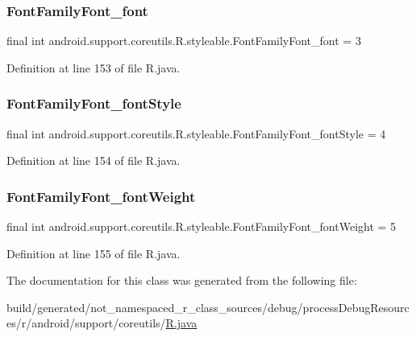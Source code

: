 \subsubsection{\texorpdfstring{FontFamilyFont\_font}{FontFamilyFont\_font}}
{\footnotesize\ttfamily final int android.\+support.\+coreutils.\+R.\+styleable.\+Font\+Family\+Font\+\_\+font = 3\hspace{0.3cm}{\ttfamily [static]}}



Definition at line 153 of file R.\+java.

\mbox{\label{classandroid_1_1support_1_1coreutils_1_1_r_1_1styleable_a1ee3d7ad4f282f1250a3ef4c1cb44053}} 
\subsubsection{\texorpdfstring{FontFamilyFont\_fontStyle}{FontFamilyFont\_fontStyle}}
{\footnotesize\ttfamily final int android.\+support.\+coreutils.\+R.\+styleable.\+Font\+Family\+Font\+\_\+font\+Style = 4\hspace{0.3cm}{\ttfamily [static]}}



Definition at line 154 of file R.\+java.

\mbox{\label{classandroid_1_1support_1_1coreutils_1_1_r_1_1styleable_a08ae17280f865bcf7bb8a223b10003cd}} 
\subsubsection{\texorpdfstring{FontFamilyFont\_fontWeight}{FontFamilyFont\_fontWeight}}
{\footnotesize\ttfamily final int android.\+support.\+coreutils.\+R.\+styleable.\+Font\+Family\+Font\+\_\+font\+Weight = 5\hspace{0.3cm}{\ttfamily [static]}}



Definition at line 155 of file R.\+java.



The documentation for this class was generated from the following file\+:\begin{DoxyCompactItemize}
\item 
build/generated/not\+\_\+namespaced\+\_\+r\+\_\+class\+\_\+sources/debug/process\+Debug\+Resources/r/android/support/coreutils/\mbox{\hyperlink{android_2support_2coreutils_2_r_8java}{R.\+java}}\end{DoxyCompactItemize}
